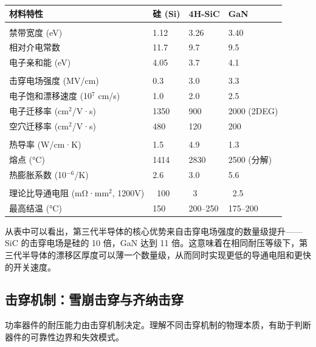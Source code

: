 \begin{exhibitbox}[表 4-3：三种半导体材料本征参数对比]
\centering
\small
\setlength{\tabcolsep}{4pt}
\begin{tabularx}{\textwidth}{L{3.2cm} C{2.8cm} C{2.8cm} X}
\toprule
\textbf{材料特性} & \textbf{硅 (Si)} & \textbf{4H-SiC} & \textbf{GaN} \\
\midrule
{}
 \\
禁带宽度 (eV) & 1.12 & 3.26 & 3.40 \\
相对介电常数 & 11.7 & 9.7 & 9.5 \\
电子亲和能 (eV) & 4.05 & 3.7 & 4.1 \\
\midrule
{}
 \\
击穿电场强度 (MV/cm) & 0.3 & 3.0 & 3.3 \\
电子饱和漂移速度 (10$^7$ cm/s) & 1.0 & 2.0 & 2.5 \\
电子迁移率 (cm$^2$/V·s) & 1350 & 900 & 2000 (2DEG) \\
空穴迁移率 (cm$^2$/V·s) & 480 & 120 & 200 \\
\midrule
{}
 \\
热导率 (W/cm·K) & 1.5 & 4.9 & 1.3 \\
熔点 (°C) & 1414 & 2830 & 2500 (分解) \\
热膨胀系数 (10$^{-6}$/K) & 2.6 & 3.0 & 5.6 \\
\midrule
{}
 \\
理论比导通电阻 (mΩ·mm$^2$, 1200V) & ~100 & ~3 & ~2.5 \\
最高结温 (°C) & 150 & 200–250 & 175–200 \\
\bottomrule
\end{tabularx}
\end{exhibitbox}

从表中可以看出，第三代半导体的核心优势来自击穿电场强度的数量级提升——SiC 的击穿电场是硅的 10 倍，GaN 达到 11 倍。这意味着在相同耐压等级下，第三代半导体的漂移区厚度可以薄一个数量级，从而同时实现更低的导通电阻和更快的开关速度。

\subsection{击穿机制：雪崩击穿与齐纳击穿}

功率器件的耐压能力由击穿机制决定。理解不同击穿机制的物理本质，有助于判断器件的可靠性边界和失效模式。

